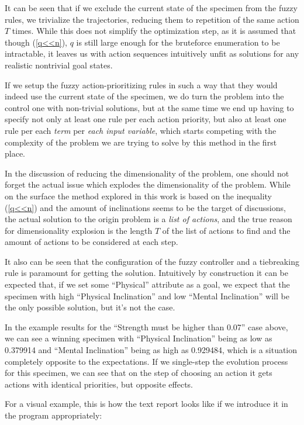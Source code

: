 \documentclass[12pt, a4paper]{article}
\begin{document}
	It can be seen that if we exclude the current state of the specimen from the fuzzy rules, we trivialize the trajectories, reducing them to repetition of the same action $T$ times.
	While this does not simplify the optimization step, as it is assumed that though (\ref{q<<n}), $q$ is still large enough for the bruteforce enumeration to be intractable, it leaves us with action sequences intuitively unfit as solutions for any realistic nontrivial goal states.
	
	If we setup the fuzzy action-prioritizing rules in such a way that they would indeed use the current state of the specimen, we do turn the problem into the control one with non-trivial solutions, but at the same time we end up having to specify not only at least one rule per each action priority, but also at least one rule per each \textit{term} per \textit{each input variable}, which starts competing with the complexity of the problem we are trying to solve by this method in the first place.
	
	In the discussion of reducing the dimensionality of the problem, one should not forget the actual issue which explodes the dimensionality of the problem.
	While on the surface the method explored in this work is based on the inequality (\ref{q<<n}) and the amount of inclinations seems to be the target of discussions, the actual solution to the origin problem is a \textit{list of actions}, and the true reason for dimensionality explosion is the length $T$ of the list of actions to find and the amount of actions to be considered at each step.
	
	It also can be seen that the configuration of the fuzzy controller and a tiebreaking rule is paramount for getting the solution.
	Intuitively by construction it can be expected that, if we set some ``Physical'' attribute as a goal, we expect that the specimen with high ``Physical Inclination'' and low ``Mental Inclination'' will be the only possible solution, but it's not the case.
	
	In the example results for the ``Strength must be higher than 0.07'' case above, we can see a winning specimen with ``Physical Inclination'' being as low as 0.379914 and ``Mental Inclination'' being as high as 0.929484,
	which is a situation completely opposite to the expectations.
	If we single-step the evolution process for this specimen, we can see that on the step of choosing an action it gets actions with identical priorities, but opposite effects.
	
	For a visual example, this is how the text report looks like if we introduce it in the program appropriately:
	
\end{document}
